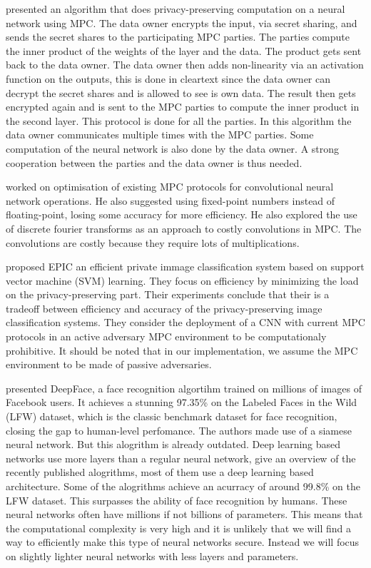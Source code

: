 \cite{barni2006privacy} presented an algorithm that does privacy-preserving computation on a neural network using MPC. The data owner encrypts the input, via secret sharing, and sends the secret shares to the participating MPC parties. The parties compute the inner product of the weights of the layer and the data. The product gets sent back to the data owner. The data owner then adds non-linearity via an activation function on the outputs, this is done in cleartext since the data owner can decrypt the secret shares and is allowed to see is own data. The result then gets encrypted again and is sent to the MPC parties to compute the inner product in the second layer. This protocol is done for all the parties. In this algorithm the data owner communicates multiple times with the MPC parties. Some computation of the neural network is also done by the data owner. A strong cooperation between the parties and the data owner is thus needed.

\cite{campmans2018optimizing} worked on optimisation of existing MPC protocols for convolutional neural network operations. He also suggested using fixed-point numbers instead of floating-point, losing some accuracy for more efficiency. He also explored the use of discrete fourier transforms as an approach to costly convolutions in MPC. The convolutions are costly because they require lots of multiplications.

\cite{makri2019epic} proposed EPIC an efficient private immage classification system based on support vector machine (SVM) learning. They focus on efficiency by minimizing the load on the privacy-preserving part. Their experiments conclude that their is a tradeoff between efficiency and accuracy of the privacy-preserving image classification systems. They consider the deployment of a CNN with current MPC protocols in an active adversary MPC environment to be computationaly prohibitive. It should be noted that in our implementation, we assume the MPC environment to be made of passive adversaries.

\cite{taigman2014deepface} presented DeepFace, a face recognition algortihm trained on millions of images of Facebook users. It achieves a stunning 97.35\% on the Labeled Faces in the Wild (LFW) dataset, which is the classic benchmark dataset for face recognition, closing the gap to human-level perfomance. The authors made use of a siamese neural network. But this alogrithm is already outdated. Deep learning based networks use more layers than a regular neural network, \cite{wang2018deep} give an overview of the recently published alogrithms, most of them use a deep learning based architecture. Some of the alogrithms achieve an acurracy of around 99.8\% on the LFW dataset. This surpasses the ability of face recognition by humans. These neural networks often have millions if not billions of parameters. This means that the computational complexity is very high and it is unlikely that we will find a way to efficiently make this type of neural networks secure. Instead we will focus on slightly lighter neural networks with less layers and parameters.

